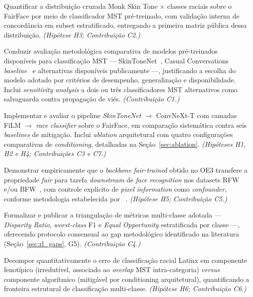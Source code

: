 \begin{description}[font=\bfseries\sffamily]
\item[OE1.] Quantificar a distribuição cruzada Monk Skin Tone $\times$ classes raciais sobre o FairFace por meio de classificador MST pré-treinado, com validação interna de concordância em subset estratificado, entregando a primeira matriz pública dessa distribuição. \textit{(Hipótese H3; Contribuição C2.)}

\item[OE2.] Conduzir avaliação metodológica comparativa de modelos pré-treinados disponíveis para classificação MST --- SkinToneNet~\autocite{matias2026large}, Casual Conversations \emph{baseline}~\autocite{hazirbas2021towards,porgali2023casual} e alternativas disponíveis publicamente ---, justificando a escolha do modelo adotado por critérios de desempenho, generalização e disponibilidade. Inclui \emph{sensitivity analysis} a dois ou três classificadores MST alternativos como salvaguarda contra propagação de viés. \textit{(Contribuição C1.)}

\item[OE3.] Implementar e avaliar o pipeline \emph{SkinToneNet} $\rightarrow$ ConvNeXt-T com camadas FiLM $\rightarrow$ \emph{race classifier} sobre o FairFace, em comparação sistemática contra seis \emph{baselines} de mitigação. Inclui \emph{ablation} arquitetural com quatro configurações comparativas de \emph{conditioning}, detalhadas na Seção~\ref{sec:ablation}. \textit{(Hipóteses H1, H2 e H4; Contribuições C3 e C7.)}

\item[OE4.] Demonstrar empiricamente que o \emph{backbone} \emph{fair-trained} obtido no OE3 transfere a propriedade \emph{fair} para tarefa \emph{downstream} de \emph{face recognition} nos datasets RFW~\autocite{wang2019racial} e/ou BFW~\autocite{robinson2020face}, com controle explícito de \emph{pixel information} como \emph{confounder}, conforme metodologia estabelecida por \citeauthor{pangelinan2023exploring}~\autocite{pangelinan2023exploring}. \textit{(Hipótese H5; Contribuição C5.)}

\item[OE5.] Formalizar e publicar a triangulação de métricas multi-classe adotada --- \emph{Disparity Ratio}, \emph{worst-class} F1 e \emph{Equal Opportunity} estratificada por classe ---, oferecendo protocolo consensual ao gap metodológico identificado na literatura (Seção~\ref{sec:rl_gaps}, G5). \textit{(Contribuição C4.)}

\item[OE6.] Decompor quantitativamente o erro de classificação racial Latinx em componente fenotípico (irredutível, associado ao \emph{overlap} MST intra-categoria) \emph{versus} componente algorítmico (mitigável por conditioning arquitetural), quantificando a fronteira estrutural de classificação multi-classe. \textit{(Hipótese H6; Contribuição C6.)}
\end{description}

